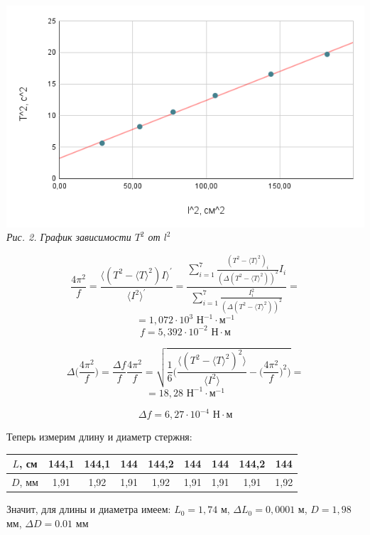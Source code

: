 \documentclass[12pt, a4paper]{article}
\begin{document}
\begin{center}
    \includegraphics[scale=0.82]{Pics/picture2.png} \\
    \textit{\textcolor[HTML]{000000}{Рис. 2. График зависимости $T^2$ от $l^2$}}
\end{center}

\[\frac{4\pi^2}{f} = \frac{\langle (T^2 - \langle T \rangle^2) I \rangle^{'}}{\langle I^2 \rangle^{'}} = \frac{\sum_{i = 1}^{7} \frac{(T^2 - \langle T \rangle^2)_i}{(\Delta (T^2 - \langle T \rangle^2))^2} I_i}{\sum_{i = 1}^{7} \frac{I^2_i}{(\Delta (T^2 - \langle T \rangle^2))^2}} = \]
\[= 1,072 \cdot 10^3 \text{ Н}^{-1} \cdot \text{м}^{-1}\]
\[f = 5,392 \cdot 10^{-2}\text{ Н} \cdot \text{м}\]

\[\Delta \Big(\frac{4\pi^2}{f}\Big) =  \frac{\Delta f}{f} \frac{4\pi^2}{f} = \sqrt{\frac{1}{6}\Big( \frac{\langle (T^2 - \langle T \rangle^2)^2 \rangle}{\langle I^2 \rangle} - \Big(\frac{4\pi^2}{f}\Big)^2\Big)} = \]
\[= 18,28 \text{ Н}^{-1} \cdot \text{м}^{-1}\]

\[\Delta f = 6,27 \cdot 10^{-4}\text{ Н} \cdot \text{м}\]

Теперь измерим длину и диаметр стержня:
\begin{center}
\begin{tabular}{|c|c|c|c|c|c|c|c|c|}
\hline 
$L$, см & 144,1 & 144,1 & 144 & 144,2 & 144 & 144 & 144,2 & 144 \\ 
\hline 
$D$, мм & 1,91 & 1,92 & 1,91 & 1,92 & 1,91 & 1,91 & 1,91 & 1,92  \\ 
\hline 
\end{tabular}
\end{center} 

Значит, для длины и диаметра имеем: $L_0 = 1,74$ м, $\Delta L_0 = 0,0001$ м, $D = 1,98$ мм, $\Delta D = 0.01 \text{ мм}$ 
\end{document}
